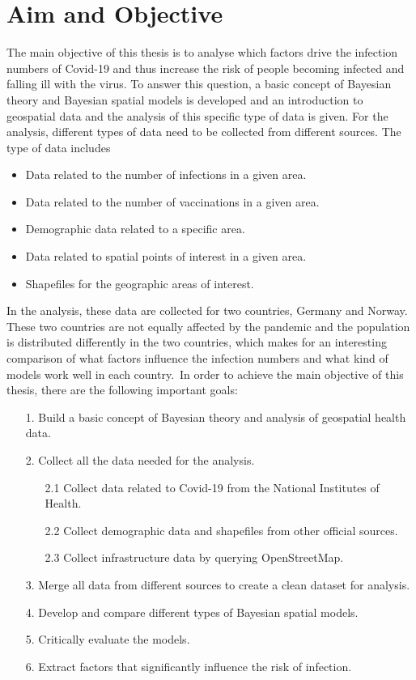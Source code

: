 \section{Aim and Objective}
The main objective of this thesis is to analyse which factors drive the infection numbers of Covid-19 and thus increase the risk of people becoming infected and falling ill with the virus. To answer this question, a basic concept of Bayesian theory and Bayesian spatial models is developed and an introduction to geospatial data and the analysis of this specific type of data is given. For the analysis, different types of data need to be collected from different sources. The type of data includes
\begin{itemize}
    \item Data related to the number of infections in a given area.
    \item Data related to the number of vaccinations in a given area.
    \item Demographic data related to a specific area.
    \item Data related to spatial points of interest in a given area.
    \item Shapefiles for the geographic areas of interest.
\end{itemize}
In the analysis, these data are collected for two countries, Germany and Norway. These two countries are not equally affected by the pandemic and the population is distributed differently in the two countries, which makes for an interesting comparison of what factors influence the infection numbers and what kind of models work well in each country.\
In order to achieve the main objective of this thesis, there are the following important goals:
\begin{itemize}
    \item[1.] Build a basic concept of Bayesian theory and analysis of geospatial health data.
    \item[2.] Collect all the data needed for the analysis.
    \begin{itemize}
    \item[2.1] Collect data related to Covid-19 from the National Institutes of Health.
    \item[2.2] Collect demographic data and shapefiles from other official sources.
    \item[2.3] Collect infrastructure data by querying OpenStreetMap.
    \end{itemize}
    \item[3.] Merge all data from different sources to create a clean dataset for analysis.
    \item[4.] Develop and compare different types of Bayesian spatial models.
    \item[5.] Critically evaluate the models.
    \item[6.] Extract factors that significantly influence the risk of infection.
\end{itemize}
\clearpage
